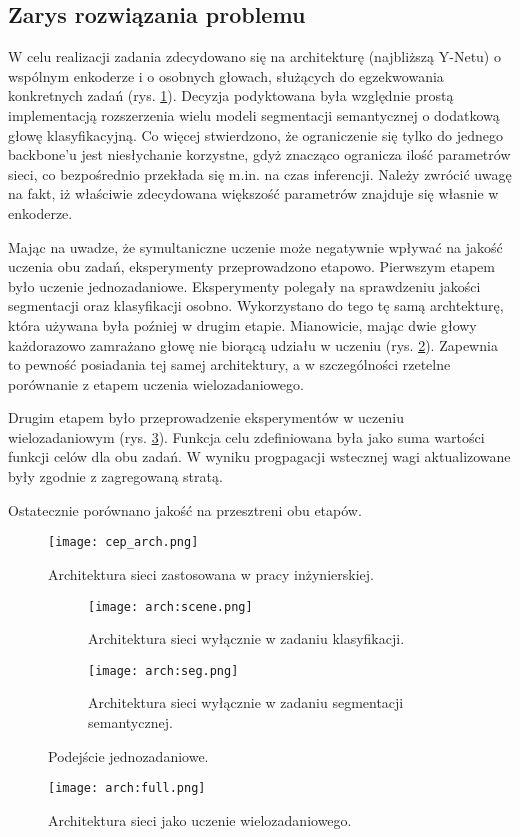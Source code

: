 \subsection{Zarys rozwiązania problemu}
W celu realizacji zadania zdecydowano się na architekturę (najbliższą Y-Netu) o wspólnym enkoderze i o osobnych głowach, służących do egzekwowania konkretnych zadań (rys. \ref{fig:cep_arch}). Decyzja podyktowana była względnie prostą implementacją rozszerzenia wielu modeli segmentacji semantycznej o dodatkową głowę klasyfikacyjną. Co więcej stwierdzono, że ograniczenie się tylko do jednego backbone'u jest niesłychanie korzystne, gdyż znacząco ogranicza ilość parametrów sieci, co bezpośrednio przekłada się m.in. na czas inferencji. Należy zwrócić uwagę na fakt, iż właściwie zdecydowana większość parametrów znajduje się własnie w enkoderze.

Mając na uwadze, że symultaniczne uczenie może negatywnie wpływać na jakość uczenia obu zadań, eksperymenty przeprowadzono etapowo. Pierwszym etapem było uczenie jednozadaniowe. Eksperymenty polegały na sprawdzeniu jakości segmentacji oraz klasyfikacji osobno. Wykorzystano do tego tę samą archtekturę, która używana była poźniej w drugim etapie. Mianowicie, mając dwie głowy każdorazowo zamrażano głowę nie biorącą udziału w uczeniu (rys. \ref{fig:arch-scene-seg}). Zapewnia to pewność posiadania tej samej architektury, a w szczególności rzetelne porównanie z etapem uczenia wielozadaniowego.

Drugim etapem było przeprowadzenie eksperymentów w uczeniu wielozadaniowym (rys. \ref{fig:arch-full}). Funkcja celu zdefiniowana była jako suma wartości funkcji celów dla obu zadań. W wyniku progpagacji wstecznej wagi aktualizowane były zgodnie z zagregowaną stratą.

Ostatecznie porównano jakość na przesztreni obu etapów.

\begin{figure}
    \centering
    \texttt{[image: cep\_arch.png]}
    \caption{Architektura sieci zastosowana w pracy inżynierskiej.}
    \label{fig:cep_arch}
\end{figure}

\begin{figure}
    \centering
    \begin{subfigure}[b]{0.49\textwidth}
        \centering
        \texttt{[image: arch:scene.png]}
        \caption{Architektura sieci wyłącznie w zadaniu klasyfikacji.}
    \end{subfigure}
    \hfill
    \begin{subfigure}[b]{0.49\textwidth}
        \centering
        \texttt{[image: arch:seg.png]}
        \caption{Architektura sieci wyłącznie w zadaniu segmentacji semantycznej.}
    \end{subfigure}
    \caption[]{Podejście jednozadaniowe.}
    \label{fig:arch-scene-seg}
\end{figure}

\begin{figure}
    \centering
    \texttt{[image: arch:full.png]}
    \caption{Architektura sieci jako uczenie wielozadaniowego.}
    \label{fig:arch-full}
\end{figure}
